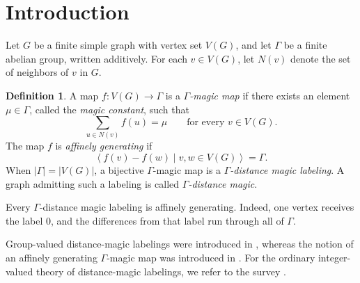 \documentclass[11pt,reqno]{amsart}
\theoremstyle{plain}
\theoremstyle{definition}
\newtheorem{definition}[theorem]{Definition}
\theoremstyle{remark}
\begin{document}
\maketitle

\section{Introduction}\label{sec:intro}

Let $G$ be a finite simple graph with vertex set $V(G)$, and let $\Gamma$ be a
finite abelian group, written additively. For each $v\in V(G)$, let $N(v)$ denote the
set of neighbors of $v$ in $G$.

\begin{definition}\label{def:gdm}
A map $f\colon V(G)\to\Gamma$ is a \emph{$\Gamma$-magic map} if there exists
an element $\mu\in\Gamma$, called the \emph{magic constant}, such that
\[
  \sum_{u\in N(v)}f(u)=\mu
  \qquad\text{for every }v\in V(G).
\]
The map $f$ is \emph{affinely generating} if
\[
  \left\langle f(v)-f(w)\mid v,w\in V(G)\right\rangle=\Gamma.
\]
When $|\Gamma|=|V(G)|$, a bijective $\Gamma$-magic map is a
\emph{$\Gamma$-distance magic labeling}.
A graph admitting such a labeling is called \emph{$\Gamma$-distance magic}.
\end{definition}

Every $\Gamma$-distance magic labeling is affinely generating. Indeed, one
vertex receives the label $0$, and the differences from that label run through
all of $\Gamma$.

Group-valued distance-magic labelings were introduced in \cite{Fro13,CFSZ16}, whereas the notion of an affinely generating $\Gamma$-magic map was introduced in \cite{Bat26}. For the ordinary integer-valued theory of distance-magic labelings, we refer to the survey \cite{AFK11}.
\end{document}
